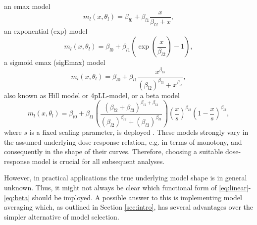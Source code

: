 {an emax model
\begin{equation} \label{eq:emax}
    m_l(x, \theta_l) = \beta_{l0} + \beta_{l1} \frac{x}{\beta_{l2} + x},
\end{equation}
an exponential (exp) model 
\begin{equation} \label{eq:exp}
    m_l(x, \theta_l) = \beta_{l0} + \beta_{l1} \left( \exp \left( \frac{x}{\beta_{l2}} \right) -1 \right),
\end{equation} 
a sigmoid emax (sigEmax) model
\begin{equation} \label{eq:sigemax}
    m_l(x, \theta_l) = \beta_{l0} + \beta_{l1} \frac{x^{\beta_{l3}}}{\left( \beta_{l2}\right)^{\beta_{l3}} + x^{\beta_{l3}}},
\end{equation}
also known as Hill model or 4pLL-model, or a beta model
\begin{equation} \label{eq:beta}
    m_l(x, \theta_l) = \beta_{l0} + \beta_{l1} \left(\frac{\left( \beta_{l2} + \beta_{l3}\right)^{\beta_{l2} + \beta_{l3}}}{\left( \beta_{l2}\right)^{\beta_{l2}}+ \left( \beta_{l3}\right)^{\beta_{l3}}}\right) \left(\frac{x}{s}\right)^{\beta_{l2}}  \left(1 - \frac{x}{s} \right) ^{\beta_{l3}},
\end{equation}
where $s$ is a fixed scaling parameter, is deployed 
\citep[][]{Bretz2005, Pinheiro2006, Pinheiro2014, Duda2022}.
These models strongly vary in the assumed underlying dose-response relation, e.g. in terms of monotony, and consequently in the shape of their curves. Therefore, choosing a suitable dose-response model is crucial for all subsequent analyses.  

However, in practical applications the true underlying model shape is in general unknown. Thus, it might not always be clear which functional form of \ref{eq:linear}-\ref{eq:beta} should be imployed. A possible answer to this is implementing
model averaging which, as outlined in Section \ref{sec:intro}, has several advantages over the simpler alternative of model selection. 

}

